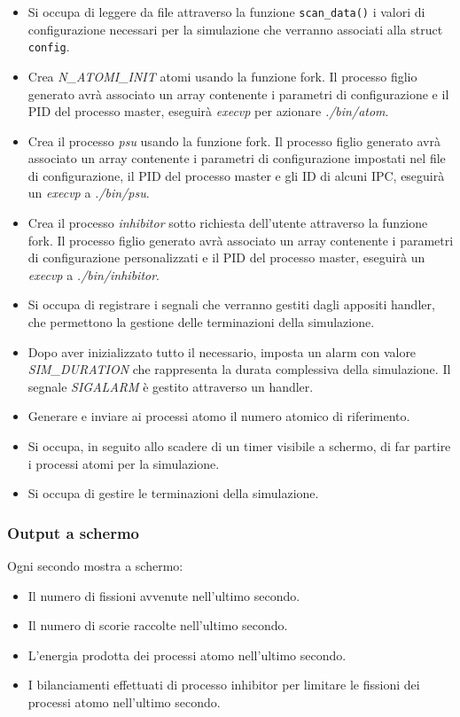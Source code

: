 \begin{itemize}
    \item Si occupa di leggere da file attraverso la funzione \lstinline|scan_data()| i valori di configurazione necessari per la simulazione che verranno associati alla struct \lstinline{config}. 
    \item Crea \textit{N\_ATOMI\_INIT} atomi usando la funzione fork. Il processo figlio generato avrà associato un array contenente i parametri di configurazione e il PID del processo master, eseguirà  \textit{execvp} per azionare \textit{./bin/atom}.
    \item Crea il processo \textit{psu} usando la funzione fork. Il processo figlio generato avrà associato un array contenente i parametri di configurazione impostati nel file di configurazione, il PID del processo master e gli ID di alcuni IPC, eseguirà un \textit{execvp} a \textit{./bin/psu}. 
    \item Crea il processo \textit{inhibitor} sotto richiesta dell'utente attraverso la funzione fork. Il processo figlio generato avrà associato un array contenente i parametri di configurazione personalizzati e il PID del processo master, eseguirà un \textit{execvp} a \textit{./bin/inhibitor}.
    \item Si occupa di registrare i segnali che verranno gestiti dagli appositi handler, che permettono la gestione delle terminazioni della simulazione. 
    \item Dopo aver inizializzato tutto il necessario, imposta un alarm con valore \textit{SIM\_DURATION} che rappresenta la durata complessiva della simulazione. Il segnale \textit{SIGALARM} è gestito attraverso un handler.
    \item Generare e inviare ai processi atomo il numero atomico di riferimento. 
   
    \item Si occupa, in seguito allo scadere di un timer visibile a schermo, di far partire i processi atomi per la simulazione. 
    \item Si occupa di gestire le terminazioni della simulazione.
\end{itemize}

\subsubsection{Output a schermo}
Ogni secondo mostra a schermo: 
    \begin{itemize}
        \item Il numero di fissioni avvenute nell'ultimo secondo. 
        \item Il numero di scorie raccolte nell'ultimo secondo.
        \item L'energia prodotta dei processi atomo nell'ultimo secondo.
        \item I bilanciamenti effettuati di processo inhibitor per limitare le fissioni dei processi atomo nell'ultimo secondo. 
    \end{itemize}